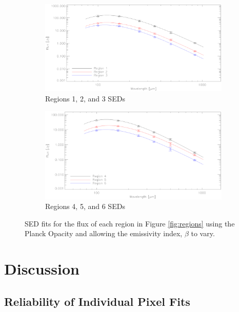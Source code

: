\begin{figure}
  \centering
  \begin{subfigure}[t]{1\textwidth}
    \centering
    \includegraphics[width=1\linewidth]{sed_imgs/123.eps}
    \caption{Regions 1, 2, and 3 SEDs}
  \end{subfigure}
  
  \begin{subfigure}[t]{1\textwidth}
    \centering
    \includegraphics[width=1.\linewidth]{sed_imgs/456.eps}
    \caption{Regions 4, 5, and 6 SEDs}
  \end{subfigure}
  \caption[Region Flux SED Fits]{SED fits for the flux of each region in Figure \ref{fig:regions} using the Planck Opacity and allowing the emissivity index, $\beta$ to vary.}
  \label{fig:SED_region}
\end{figure}
  
\section{Discussion}
\subsection{Reliability of Individual Pixel Fits}

